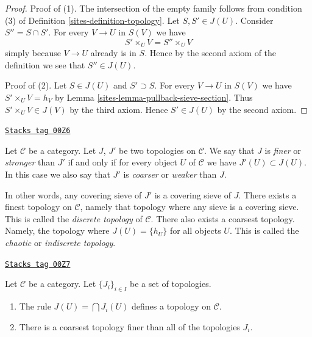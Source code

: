 \begin{proof}

Proof of (1). The intersection of the empty family follows from condition
(3) of Definition \ref{sites-definition-topology}.
Let $S, S' \in J(U)$. Consider $S'' = S \cap S'$. For every
$V \to U$ in $S(V)$ we have
$$
S' \times_U V = S'' \times_U V
$$
simply because $V \to U$ already is in $S$. Hence by the second
axiom of the definition we see that $S'' \in J(U)$.

\medskip\noindent
Proof of (2). Let $S \in J(U)$ and $S' \supset S$. For every
$V \to U$ in $S(V)$ we have $S' \times_U V = h_V$ by
Lemma \ref{sites-lemma-pullback-sieve-section}. Thus
$S' \times_U V \in J(V)$ by the third axiom. Hence
$S' \in J(U)$ by the second axiom.
\end{proof}

\begin{definition}[Finer]
\label{sites-definition-finer}
\href{https://stacks.math.columbia.edu/tag/00Z6}{\texttt{Stacks tag 00Z6}}

Let $\mathcal{C}$ be a category. Let $J$, $J'$ be
two topologies on $\mathcal{C}$. We say that $J$ is
{\it finer} or {\it stronger} than $J'$ if and only if for every object
$U$ of $\mathcal{C}$ we have $J'(U) \subset J(U)$.
In this case we also say that $J'$ is
{\it coarser} or {\it weaker} than $J$.
\end{definition}

In other words, any covering sieve of $J'$ is a
covering sieve of $J$. There exists a finest topology
on $\mathcal{C}$, namely that topology where any sieve
is a covering sieve. This is called the
{\it discrete topology} of $\mathcal{C}$.
There also exists a coarsest topology.
Namely, the topology where $J(U) = \{h_U\}$
for all objects $U$. This is called the
{\it chaotic} or {\it indiscrete topology}.

\begin{lemma}
\label{sites-lemma-play-with-topologies}
\href{https://stacks.math.columbia.edu/tag/00Z7}{\texttt{Stacks tag 00Z7}}

Let $\mathcal{C}$ be a category.
Let $\{J_i\}_{i\in I}$ be a set of topologies.
\begin{enumerate}
\item The rule $J(U) = \bigcap J_i(U)$ defines
a topology on $\mathcal{C}$.
\item There is a coarsest topology finer than
all of the topologies $J_i$.
\end{enumerate}
\end{lemma}

